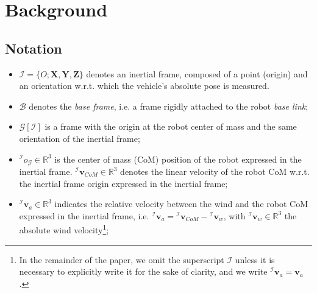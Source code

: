 \section{Background}
\label{background}

\subsection{Notation}
\begin{itemize}
    \item $\mathcal{I}=\{O;\boldsymbol{X},\boldsymbol{Y},\boldsymbol{Z}\}$ denotes an inertial frame, composed of a point (origin) and an orientation w.r.t. which the vehicle’s absolute pose is measured.

    \item $\mathcal{B}$ denotes the \emph{base frame}, i.e. a frame rigidly attached to the robot \emph{base link};
    
    \item $\mathcal{G}[\mathcal{I}]$ is a frame with the origin at the robot center of mass and the same orientation of the inertial frame;
    
    \item ${}^{\mathcal{I}}o_{\mathcal{G}} \in \mathbb{R}^3$ is the center of mass (CoM) position of the robot expressed in the inertial frame. ${}^{\mathcal{I}}\boldsymbol{v}_{CoM} \in \mathbb{R}^3$ denotes the linear velocity of the robot CoM w.r.t. the inertial frame origin expressed in the inertial frame;

    \item ${}^{\mathcal{I}}\boldsymbol{v}_a \in \mathbb{R}^3$ indicates the relative velocity between the wind and the robot CoM expressed in the inertial frame, i.e. ${}^{\mathcal{I}}\boldsymbol{v}_a={}^{\mathcal{I}}\boldsymbol{v}_{CoM}-{}^{\mathcal{I}}\boldsymbol{v}_w$, with ${}^{\mathcal{I}}\boldsymbol{v}_w \in \mathbb{R}^3$ the absolute wind velocity\footnote{In the remainder of the paper, we omit the superscript $\mathcal{I}$ unless it is necessary to explicitly write it for the sake of clarity, and we write ${}^{\mathcal{I}}\boldsymbol{v}_a=\boldsymbol{v}_a$.};
    
    

\end{itemize}
